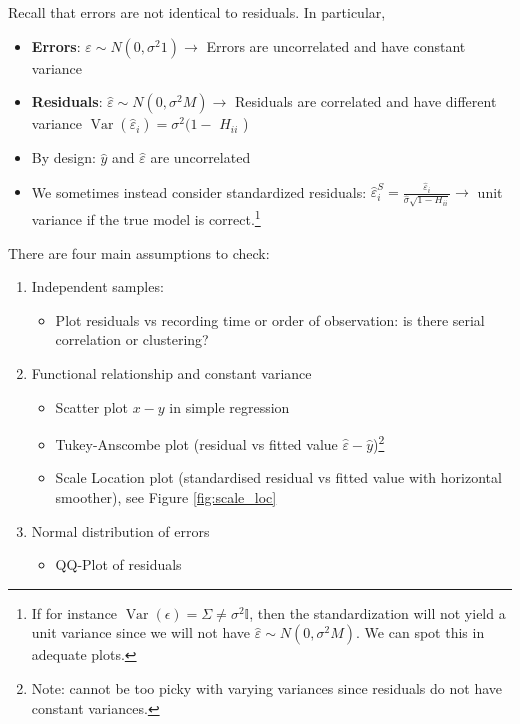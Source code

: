 \documentclass[11pt, %
	oneside, %
	english, %
	onehalfspacing, %
	]{article} %
\numberwithin{equation}{section}
\begin{document}
Recall that errors are not identical to residuals. In particular,

\begin{itemize}
	\item \textbf{Errors}: $\varepsilon \sim N\left(0, \sigma^2 1\right) \rightarrow$ Errors are uncorrelated and have constant variance
	\item \textbf{Residuals}: $\hat{\varepsilon} \sim N\left(0, \sigma^2 M\right) \rightarrow$ Residuals are correlated and have different variance $\operatorname{Var}\left(\hat{\varepsilon}_i\right)=\sigma^2(1-$ $H_{i i}$ )
	\item By design: $\hat{y}$ and $\hat{\varepsilon}$ are uncorrelated
	\item We sometimes instead consider standardized residuals: $\hat{\varepsilon}_i^S=\frac{\hat{\varepsilon}_i}{\hat{\sigma} \sqrt{1-H_{i i}}} \rightarrow$ unit variance if the true model is correct.\footnote{If for instance $\operatorname{Var}(\epsilon) = \Sigma \neq \sigma^2 \mathbb{I}$, then the standardization will not yield a unit variance since we will not have $\hat{\varepsilon} \sim N\left(0, \sigma^2 M\right)$. We can spot this in adequate plots.}
\end{itemize}

There are four main assumptions to check:

\begin{enumerate}
    \item Independent samples:
    \begin{itemize}
        \item Plot residuals vs recording time or order of observation: is there serial correlation or clustering?
    \end{itemize}
    \item Functional relationship and constant variance
    \begin{itemize}
        \item Scatter plot $x -y $ in simple regression
        \item Tukey-Anscombe plot (residual vs fitted value $\hat{\varepsilon} - \hat{y}$)\footnote{Note: cannot be too picky with varying variances since residuals do not have constant variances.}
        \item Scale Location plot (standardised residual vs fitted value with horizontal smoother), see Figure \ref{fig:scale_loc}
    \end{itemize}
    \item Normal distribution of errors
    \begin{itemize}
        \item QQ-Plot of residuals
    \end{itemize}
\end{enumerate}
\end{document}
